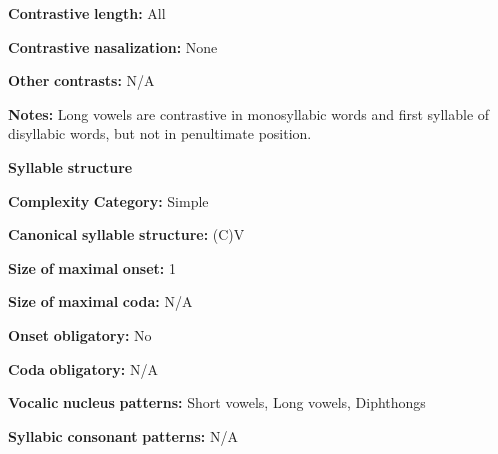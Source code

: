 \documentclass[output=paper]{langsci/langscibook}
\begin{document}
\begin{styleBody}
\textbf{Contrastive} \textbf{length:} All
\end{styleBody}

\begin{styleBody}
\textbf{Contrastive} \textbf{nasalization:} None
\end{styleBody}

\begin{styleBody}
\textbf{Other} \textbf{contrasts:} N/A
\end{styleBody}

\begin{styleBody}
\textbf{Notes:} Long vowels are contrastive in monosyllabic words and first syllable of disyllabic words, but not in penultimate position.
\end{styleBody}

\begin{styleBody}
\textbf{Syllable} \textbf{structure}
\end{styleBody}

\begin{styleBody}
\textbf{Complexity} \textbf{Category:} Simple
\end{styleBody}

\begin{styleBody}
\textbf{Canonical} \textbf{syllable} \textbf{structure:} (C)V \citep[211-18]{Chen2006}
\end{styleBody}

\begin{styleBody}
\textbf{Size} \textbf{of} \textbf{maximal} \textbf{onset:} 1
\end{styleBody}

\begin{styleBody}
\textbf{Size} \textbf{of} \textbf{maximal} \textbf{coda:} N/A
\end{styleBody}

\begin{styleBody}
\textbf{Onset} \textbf{obligatory:} No
\end{styleBody}

\begin{styleBody}
\textbf{Coda} \textbf{obligatory:} N/A
\end{styleBody}

\begin{styleBody}
\textbf{Vocalic} \textbf{nucleus} \textbf{patterns:} Short vowels, Long vowels, Diphthongs
\end{styleBody}

\begin{styleBody}
\textbf{Syllabic} \textbf{consonant} \textbf{patterns:} N/A
\end{styleBody}
\end{document}
